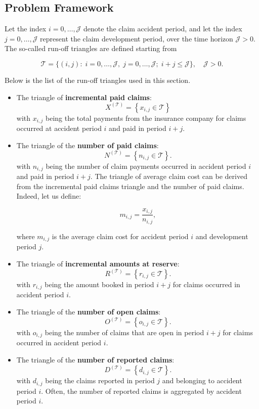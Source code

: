 \documentclass{article}
\begin{document}
\subsection{Problem Framework}

Let the index $i=0,\ldots,\mathcal{J}$ denote the claim accident period, and let the index $j=0,\ldots,\mathcal{J}$ represent the claim development period, over the time horizon $\mathcal{J}>0$.
The so-called run-off triangles are defined starting from

$$
\mathcal{T}=\{(i, j): \; i=0, \ldots, \mathcal{J}, \; j=0, \ldots, \mathcal{J}; \; i+j \leq \mathcal{J}\}, \quad \mathcal{J}>0.
$$

Below is the list of the run-off triangles used in this section.

\begin{itemize}
    \item The triangle of \textbf{incremental paid claims}:
    $$X^{\mathcal{(T)}} =\left\{x_{i, j} \in \mathcal{T} \right\}$$
    with $x_{i, j}$ being the total payments from the insurance company for claims occurred at accident period $i$ and paid in period $i+j$.
    \item The triangle of the \textbf{number of paid claims}:
    $$N^{\mathcal{(T)}} =\left\{n_{i, j} \in \mathcal{T} \right\}.$$
    with $n_{i, j}$ being the number of claim payments occurred in accident period $i$ and paid in period $i+j$. The triangle of average claim cost can be derived from the incremental paid claims triangle and the number of paid claims. Indeed, let us define:
    
    $$m_{i,j}=\frac{x_{i,j}}{n_{i, j}},$$ 
    
    where $m_{i,j}$ is the average claim cost for accident period $i$ and development period $j$.
    
    \item The triangle of \textbf{incremental amounts at reserve}:
    $$R^{\mathcal{(T)}} =\left\{r_{i, j} \in \mathcal{T} \right\}.$$
    with $r_{i, j}$ being the amount booked in period $i+j$ for claims occurred in accident period $i$.
    \item The triangle of the \textbf{number of open claims}:
    $$O^{\mathcal{(T)}} =\left\{o_{i, j} \in \mathcal{T} \right\}.$$
    with $o_{i, j}$ being the number of claims that are open in period $i+j$ for claims occurred in accident period $i$.
    \item The triangle of the \textbf{number of reported claims}:
    $$D^{\mathcal{(T)}} =\left\{d_{i, j}  \in \mathcal{T} \right\}.$$
    with $d_{i, j}$ being the claims reported in period $j$ and belonging to accident period $i$. Often, the number of reported claims is aggregated by accident period $i$. 
\end{itemize}
\end{document}
